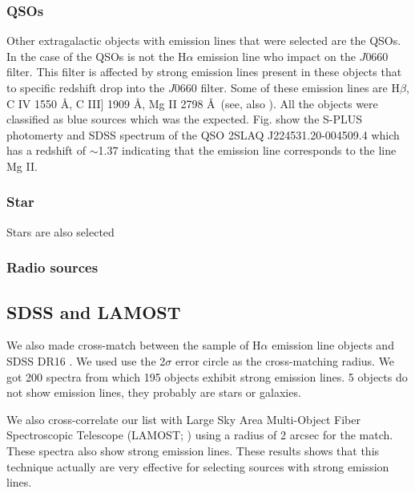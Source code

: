 \documentclass[fleqn,usenatbib]{mnras}
\begin{document}
\subsubsection{QSOs}
Other extragalactic objects with emission lines that were selected are the
QSOs. In the case of the QSOs is not the H{$\alpha$} emission line who impact
on the $J$0660 filter. This filter is affected by strong emission lines present in
these objects that to specific redshift drop into the $J$0660 filter.
Some of these emission lines are H{$\beta$}, C {\sc IV} 1550 \AA, C {\sc III]} 1909 \AA,
  Mg {\sc II} 2798 \AA~(see, also \citealp{Gutierrez:2020, Nakazono:2021}).
  All the objects were classified as blue sources which was the expected.
  Fig. show the S-PLUS photomerty and SDSS spectrum of the QSO 2SLAQ J224531.20-004509.4
  which has a redshift of $\sim$1.37 indicating that the emission line corresponds to
  the line Mg {\sc II}.
  

\subsubsection{Star}
Stars are also selected 

\subsubsection{Radio sources}

\subsection{SDSS and LAMOST}

We also made cross-match between the sample of H{$\alpha$} emission line objects and SDSS DR16
\citep{Ahumada:2020}. We used use the 2$\sigma$ error circle as the cross-matching radius.
We got 200 spectra from which 195 objects exhibit strong emission lines. 5 objects do not show
emission lines, they probably are stars or galaxies.

We also cross-correlate our list with Large Sky Area Multi-Object Fiber Spectroscopic Telescope
(LAMOST; \citealp{Wu:2011}) using a radius of 2 arcsec for the match.  These spectra also
show strong emission lines. These results shows that this technique actually are very effective
for selecting sources with strong emission lines.
\end{document}
